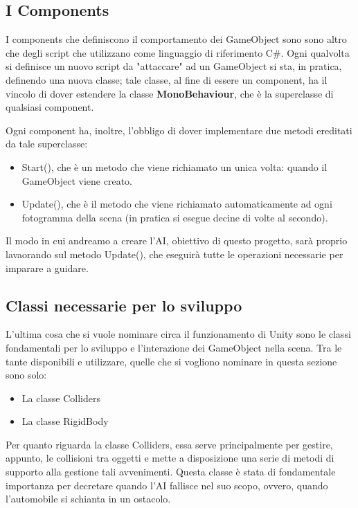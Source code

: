 \documentclass[a4paper,11pt,twoside]{report} %
\begin{document}
\subsection{I Components}

I components che definiscono il comportamento dei GameObject sono sono altro che degli script che utilizzano come linguaggio di riferimento C\#. Ogni qualvolta si definisce un nuovo script da "attaccare" ad un GameObject si sta, in pratica, definendo una nuova classe; tale classe, al fine di essere un component, ha il vincolo di dover estendere la classe \textbf{MonoBehaviour}, che è la superclasse di qualsiasi component.

Ogni component ha, inoltre, l'obbligo di dover implementare due metodi ereditati da tale superclasse:

\begin{itemize}
	\item Start(), che è un metodo che viene richiamato un unica volta: quando il GameObject viene creato.
	\item Update(), che è il metodo che viene richiamato automaticamente ad ogni fotogramma della scena (in pratica si esegue decine di volte al secondo).
\end{itemize}

Il modo in cui andreamo a creare l'AI, obiettivo di questo progetto, sarà proprio lavaorando sul metodo Update(), che eseguirà tutte le operazioni necessarie per imparare a guidare.

\subsection{Classi necessarie per lo sviluppo}

L'ultima cosa che si vuole nominare circa il funzionamento di Unity sono le classi fondamentali per lo sviluppo e l'interazione dei GameObject nella scena. Tra le tante disponibili e utilizzare, quelle che si vogliono nominare in questa sezione sono solo:

\begin{itemize}
	\item La classe Colliders
	\item La classe RigidBody
\end{itemize}

Per quanto riguarda la classe Colliders, essa serve principalmente per gestire, appunto, le collisioni tra oggetti e mette a disposizione una serie di metodi di supporto alla gestione tali avvenimenti. Questa classe è stata di fondamentale importanza per decretare quando l'AI fallisce nel suo scopo, ovvero, quando l'automobile si schianta in un ostacolo.
\end{document}
